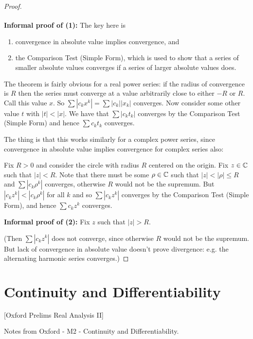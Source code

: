 \begin{proof}~\\~\\
  {\bf Informal proof of (1):} The key here is
  \begin{enumerate}
  \item convergence in absolute value implies convergence, and
  \item the Comparison Test (Simple Form), which is used to show that a series of smaller absolute
    values converges if a series of larger absolute values does.
  \end{enumerate}
  The theorem is fairly obvious for a real power series: if the radius of convergence is $R$ then
  the series must converge at a value arbitrarily close to either $-R$ or $R$. Call this value
  $x$. So $\sum |c_kx^k| = \sum |c_k||x_k|$ converges. Now consider some other value $t$ with
  $|t| < |x|$. We have that $\sum |c_kt_k|$ converges by the Comparison Test (Simple Form) and
  hence $\sum c_kt_k$ converges.

  The thing is that this works similarly for a complex power series, since convergence in absolute
  value implies convergence for complex series also:

  Fix $R > 0$ and consider the circle with radius $R$ centered on the origin. Fix $z \in \mathbb{C}$ such
  that $|z| < R$. Note that there must be some $\rho \in \mathbb{C}$ such that $|z| < |\rho| \leq R$ and
  $\sum |c_k\rho^k|$ converges, otherwise $R$ would not be the supremum. But
  $|c_kz^k| < |c_k\rho^k|$ for all $k$ and so $\sum |c_kz^k|$ converges by the Comparison Test
  (Simple Form), and hence $\sum c_kz^k$ converges.

  {\bf Informal proof of (2):} Fix $z$ such that $|z| > R$.

  (Then $\sum |c_kz^k|$ does not converge, since otherwise $R$ would not be the supremum. But lack
  of convergence in absolute value doesn't prove divergence: e.g. the alternating harmonic series
  converges.)


\end{proof}


\section{Continuity and Differentiability}
[Oxford Prelims Real Analysis II]

Notes from Oxford - M2 - Continuity and Differentiability.

